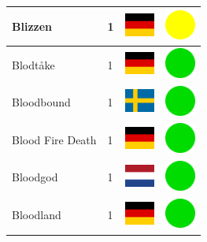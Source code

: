 \documentclass[12pt, a4paper, twoside]{report}
\begin{document}
\begin{center}
\begin{longtable}{|p{5cm}|p{2cm}|p{2cm}|p{2cm}|}
			Blizzen & 1 & \includegraphics[width=1cm]{4x3/de} & \includegraphics[width=1cm]{likes/m} \\ \hline
			Blodtåke & 1 & \includegraphics[width=1cm]{4x3/de} & \includegraphics[width=1cm]{likes/y} \\ \hline
			Bloodbound & 1 & \includegraphics[width=1cm]{4x3/se} & \includegraphics[width=1cm]{likes/y} \\ \hline
			Blood Fire Death & 1 & \includegraphics[width=1cm]{4x3/de} & \includegraphics[width=1cm]{likes/y} \\ \hline
			Bloodgod & 1 & \includegraphics[width=1cm]{4x3/nl} & \includegraphics[width=1cm]{likes/y} \\ \hline
			Bloodland & 1 & \includegraphics[width=1cm]{4x3/de} & \includegraphics[width=1cm]{likes/y} \\ \hline

\end{longtable}
\end{center}
\end{document}

